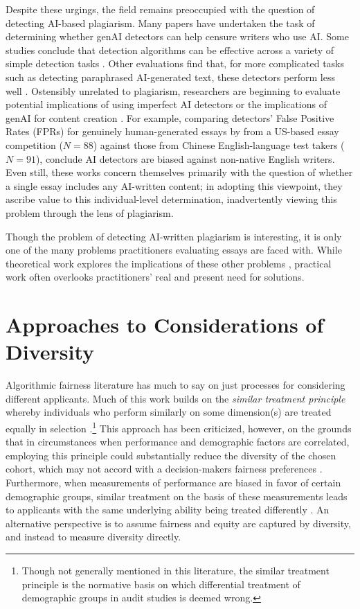 Despite these urgings, the field remains preoccupied with the question of detecting AI-based plagiarism. Many papers have undertaken the task of determining whether genAI detectors can help censure writers who use AI. Some studies conclude that detection algorithms can be effective across a variety of simple detection tasks \cite{dugan_raid_2024,weber-wulff_testing_2023,tharindu_kumarage_stylometric_2023,elkhatat_evaluating_2023,mitchell_detectgpt_2023}. Other evaluations find that, for more complicated tasks such as detecting paraphrased AI-generated text, these detectors perform less well \cite{kalpesh_krishna_paraphrasing_2023}. Ostensibly unrelated to plagiarism, researchers are beginning to evaluate potential implications of using imperfect AI detectors \cite{liang_gpt_2023} or the implications of genAI for content creation \cite{kalpesh_krishna_paraphrasing_2023}. For example, comparing detectors' False Positive Rates (FPRs) for genuinely human-generated essays by from a US-based essay competition ($N = 88$) against those from Chinese English-language test takers ($N = 91$), \textcite{liang_gpt_2023} conclude AI detectors are biased against non-native English writers. Even still, these works concern themselves primarily with the question of whether a single essay includes any AI-written content; in adopting this viewpoint, they ascribe value to this individual-level determination, inadvertently viewing this problem through the lens of plagiarism.

Though the problem of detecting AI-written plagiarism is interesting, it is only one of the many problems practitioners evaluating essays are faced with. While theoretical work explores the implications of these other problems \cite{otterbacher_why_2023,yu_huang_reflection_2023}, practical work often overlooks practitioners' real and present need for solutions.

\section{Approaches to Considerations of Diversity}
Algorithmic fairness literature has much to say on just processes for considering different applicants. Much of this work builds on the \emph{similar treatment principle} whereby individuals who perform similarly on some dimension(s) are treated equally in selection \cite{dwork_fairness_2012}.\footnote{Though not generally mentioned in this literature, the similar treatment principle is the normative basis on which differential treatment of demographic groups in audit studies is deemed wrong.} This approach has been criticized, however, on the grounds that in circumstances when performance and demographic factors are correlated, employing this principle could substantially reduce the diversity of the chosen cohort, which may not accord with a decision-makers fairness preferences \cite{fleisher2021s}. Furthermore, when measurements of performance are biased in favor of certain demographic groups, similar treatment on the basis of these measurements leads to applicants with the same underlying ability being treated differently \cite{fleisher2021s}. An alternative perspective is to assume fairness and equity are captured by diversity, and instead to measure diversity directly.

